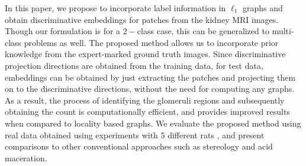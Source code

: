 In this paper, we propose to incorporate label information in $\ell_1$ graphs and obtain discriminative embeddings for patches from the kidney MRI images. Though our formulation is for a $2-$class case, this can be generalized to multi-class problems as well. The proposed method allows us to incorporate prior knowledge from the expert-marked ground truth images. Since discriminative projection directions are obtained from the training data, for test data, embeddings can be obtained by just extracting the patches and projecting them on to the discriminative directions, without the need for computing any graphs. As a result, the process of identifying the glomeruli regions and subsequently obtaining the count is computationally efficient, and provides improved results when compared to locality based graphs. We evaluate the proposed method using real data obtained using experiments with $5$ different rats \cite{}, and present comparisons to other conventional approaches such as stereology and acid maceration.